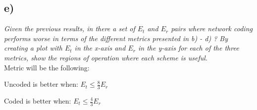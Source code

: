 \FloatBarrier
\subsection{e)} 
\textit{Given the previous results, in there a set of $E_t$ and $E_r$ pairs where network coding performs worse in terms of the different metrics presented in b) - d) ? By creating a plot with $E_t$ in the x-axis and $E_r$ in the y-axis for each of the three metrics, show the regions of operation where each scheme is useful.}\\

Metric will be the following:
\begin{pitemize}
	\item Uncoded is better when: $E_t\leq\frac{8}{3}E_r$
	\item Coded is better when: $E_t\leq\frac{4}{3}E_r$
\end{pitemize}


